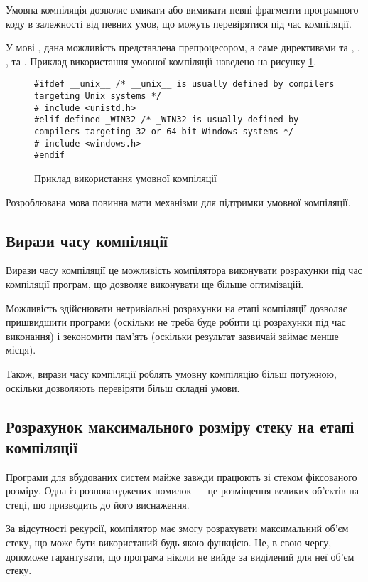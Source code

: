 \documentclass[main.tex]{subfiles}
\begin{document}
Умовна компіляція дозволяє вмикати або вимикати певні фрагменти програмного коду в залежності від певних умов, що можуть перевірятися під час компіляції.

У мові \LangC{}, дана можливість представлена препроцесором, а саме директивами  та , , ,  та . Приклад використання умовної компіляції наведено на рисунку \ref{conditional-compilation}.

\begin{figure}[h]
  \centering
  \begin{verbatim}
#ifdef __unix__ /* __unix__ is usually defined by compilers targeting Unix systems */
# include <unistd.h>
#elif defined _WIN32 /* _WIN32 is usually defined by compilers targeting 32 or 64 bit Windows systems */
# include <windows.h>
#endif
  \end{verbatim}
  \caption{Приклад використання умовної компіляції}
  \label{conditional-compilation}
\end{figure}

Розроблювана мова повинна мати механізми для підтримки умовної компіляції.

\subsection{Вирази часу компіляції}
Вирази часу компіляції це можливість компілятора виконувати розрахунки під час компіляції програм, що дозволяє виконувати ще більше оптимізацій.

Можливість здійснювати нетривіальні розрахунки на етапі компіляції дозволяє пришвидшити програми (оскільки не треба буде робити ці розрахунки під час виконання) і зекономити пам'ять (оскільки результат зазвичай займає менше місця).

Також, вирази часу компіляції роблять умовну компіляцію більш потужною, оскільки дозволяють перевіряти більш складні умови.

\subsection{Розрахунок максимального розміру стеку на етапі компіляції}
Програми для вбудованих систем майже завжди працюють зі стеком фіксованого розміру. Одна із розповсюджених помилок --- це розміщення великих об'єктів на стеці, що призводить до його виснаження.

За відсутності рекурсії, компілятор має змогу розрахувати максимальний об'єм стеку, що може бути використаний будь-якою функцією. Це, в свою чергу, допоможе гарантувати, що програма ніколи не вийде за виділений для неї об'єм стеку.
\end{document}
